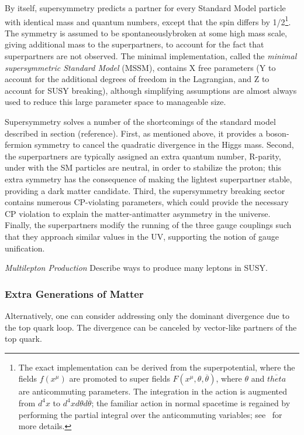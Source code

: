 By itself, supersymmetry predicts a partner for every Standard Model particle with identical mass and quantum numbers, except that the spin differs by 1/2\footnote{The exact implementation can be derived from the superpotential, where the fields $f(x^{\mu})$ are promoted to super fields $F(x^{\mu}, \theta, \overline{\theta})$, where $\theta$ and $\overline{theta}$ are anticommuting parameters. The integration in the action is augmented from $d^4x$ to $d^4x d\theta d\overline{\theta}$; the familiar action in normal spacetime is regained by performing the partial integral over the anticommuting variables; see~\cite{wess-bagger} for more details.}. The symmetry is assumed to be spontaneouslybroken at some high mass scale, giving additional mass to the superpartners, to account for the fact that superpartners are not observed. The minimal implementation, called the \emph{minimal supersymmetric Standard Model} (MSSM), contains X free parameters (Y to account for the additional degrees of freedom in the Lagrangian, and Z to account for SUSY breaking), although simplifying assumptions are almost always used to reduce this large parameter space to manageable size.

Supersymmetry solves a number of the shortcomings of the standard model described in section (reference). First, as mentioned above, it provides a boson-fermion symmetry to cancel the quadratic divergence in the Higgs mass. Second, the superpartners are typically assigned an extra quantum number, R-parity, under with the SM particles are neutral, in order to stabilize the proton; this extra symmetry has the consequence of making the lightest superpartner stable, providing a dark matter candidate. Third, the supersymmetry breaking sector contains numerous CP-violating parameters, which could provide the necessary CP violation to explain the matter-antimatter asymmetry in the universe. Finally, the superpartners modify the running of the three gauge couplings such that they approach similar values in the UV, supporting the notion of gauge unification.

\emph{Multilepton Production}
Describe ways to produce many leptons in SUSY.

\subsubsection{Extra Generations of Matter}

Alternatively, one can consider addressing only the dominant divergence due to the top quark loop. The divergence can be canceled by vector-like partners of the top quark.

